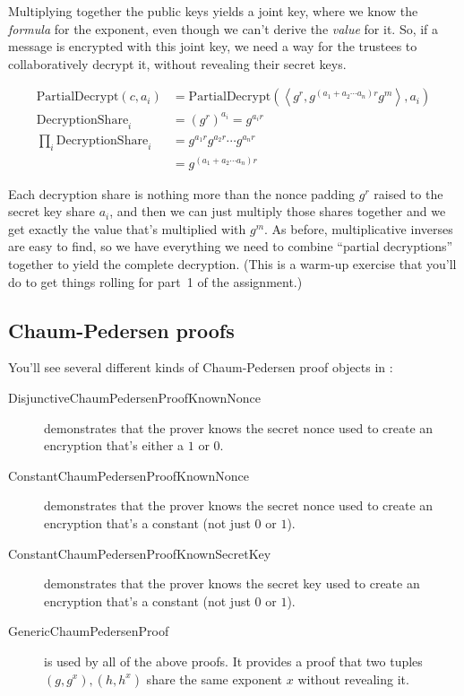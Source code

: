 Multiplying together the public keys yields a joint key, where we know
the {\em formula} for the exponent, even though we can't derive the
{\em value} for it. So, if a message is encrypted with this joint key,
we need a way for the trustees to collaboratively decrypt it, without
revealing their secret keys.

\begin{align*}
\mathrm{PartialDecrypt}(c, a_i) &= \mathrm{PartialDecrypt}\left(\left<g^r, g^{(a_1 + a_2 \cdots a_n)r}g^m\right>,a_i\right) \\
\mathrm{DecryptionShare}_i &= ({g^r})^{a_i} = g^{a_ir} \\
\prod_i \mathrm{DecryptionShare}_i &= g^{a_1r}g^{a_2r}\cdots g^{a_nr} \\
&= g^{(a_1 + a_2 \cdots a_n)r}
\end{align*}

Each decryption share is nothing more than the nonce padding $g^r$
raised to the secret key share $a_i$, and then we can just multiply
those shares together and we get exactly the value that's multiplied
with $g^m$. As before, multiplicative inverses are easy to find, so
we have everything we need to combine ``partial decryptions'' together
to yield the complete decryption. (This is a warm-up exercise that
you'll do to get things rolling for part~1 of the assignment.)


\subsection{Chaum-Pedersen proofs}
\label{sec:chaum-pedersen}
You'll see several different kinds of Chaum-Pedersen proof objects
in :
\begin{description}
\item[DisjunctiveChaumPedersenProofKnownNonce] demonstrates that the prover knows
  the secret nonce used to create an encryption that's either a $1$ or $0$.
\item[ConstantChaumPedersenProofKnownNonce] demonstrates that the prover
  knows the secret nonce used to create an encryption that's a
  constant (not just $0$ or $1$).
\item[ConstantChaumPedersenProofKnownSecretKey] demonstrates that the prover
  knows the secret key used to create an encryption that's a
  constant (not just $0$ or $1$).
\item[GenericChaumPedersenProof]
  is used by all of the above proofs. It provides a proof that two
  tuples $(g, g^x), (h, h^x)$ share the same exponent $x$ without
  revealing it.
\end{description}

